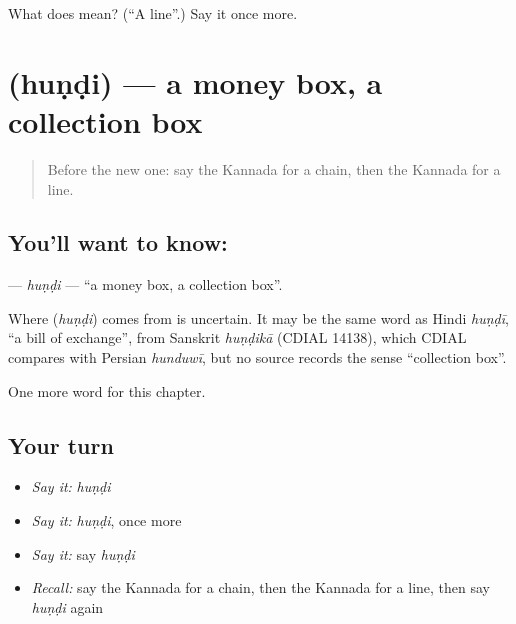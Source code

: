 \begin{tcolorbox}[breakable,colback=teal!4,colframe=teal!35!black,title={Before you move on}]
What does  mean? (\textquotedblleft{}A line\textquotedblright{}.) Say it once more.
\end{tcolorbox}
\section[\texorpdfstring{\kn{ಹುಂಡಿ} (huṇḍi)}{ಹುಂಡಿ (huṇḍi)}]{ (huṇḍi) — a money box, a collection box}

\label{lesson:KA-C230-hundi}



\begin{quote}
Before the new one: say the Kannada for a chain, then the Kannada for a line.
\end{quote}

\subsection*{You'll want to know: }
\textbf{} — \emph{huṇḍi} — \textquotedblleft{}a money box, a collection box\textquotedblright{}.

\begin{cousinweb}
Where \textbf{} (\emph{huṇḍi}) comes from is uncertain. It may be the same word as Hindi \emph{huṇḍī}, \textquotedblleft{}a bill of exchange\textquotedblright{}, from Sanskrit \emph{huṇḍikā} (CDIAL 14138), which CDIAL compares with Persian \emph{hunduwī}, but no source records the sense \textquotedblleft{}collection box\textquotedblright{}.
\end{cousinweb}

\begin{grammarlens}[title={What you've built}]
One more word for this chapter.
\end{grammarlens}

\subsection*{Your turn}
\begin{itemize}
\raggedright
  \item \emph{Say it:} \emph{huṇḍi}
  \item \emph{Say it:} \emph{huṇḍi}, once more
  \item \emph{Say it:} say \emph{huṇḍi}
  \item \emph{Recall:} say the Kannada for a chain, then the Kannada for a line, then say \emph{huṇḍi} again
\end{itemize}

